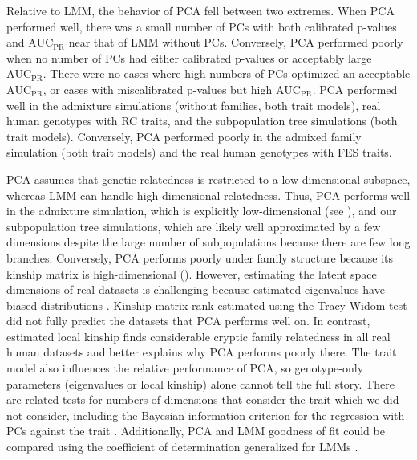 \documentclass[9pt,lineno]{elife}
\newcommand{\auc}{\text{AUC}_\text{PR}}
\begin{document}
Relative to LMM, the behavior of PCA fell between two extremes.
When PCA performed well, there was a small number of PCs with both calibrated p-values and $\auc$ near that of LMM without PCs.
Conversely, PCA performed poorly when no number of PCs had either calibrated p-values or acceptably large $\auc$.
There were no cases where high numbers of PCs optimized an acceptable $\auc$, or cases with miscalibrated p-values but high $\auc$.
PCA performed well in the admixture simulations (without families, both trait models), real human genotypes with RC traits, and the subpopulation tree simulations (both trait models).
Conversely, PCA performed poorly in the admixed family simulation (both trait models) and the real human genotypes with FES traits.

PCA assumes that genetic relatedness is restricted to a low-dimensional subspace, whereas LMM can handle high-dimensional relatedness.
Thus, PCA performs well in the admixture simulation, which is explicitly low-dimensional (see ), and our subpopulation tree simulations, which are likely well approximated by a few dimensions despite the large number of subpopulations because there are few long branches.
Conversely, PCA performs poorly under family structure because its kinship matrix is high-dimensional ().
However, estimating the latent space dimensions of real datasets is challenging because estimated eigenvalues have biased distributions \citep{hayashi_bias_2018}.
Kinship matrix rank estimated using the Tracy-Widom test \citep{patterson_population_2006} did not fully predict the datasets that PCA performs well on.
In contrast, estimated local kinship finds considerable cryptic family relatedness in all real human datasets and better explains why PCA performs poorly there.
The trait model also influences the relative performance of PCA, so genotype-only parameters (eigenvalues or local kinship) alone cannot tell the full story.
There are related tests for numbers of dimensions that consider the trait which we did not consider, including the Bayesian information criterion for the regression with PCs against the trait \citep{zhu_nonmetric_2009}.
Additionally, PCA and LMM goodness of fit could be compared using the coefficient of determination generalized for LMMs \citep{sun_variation_2010}.
\end{document}
